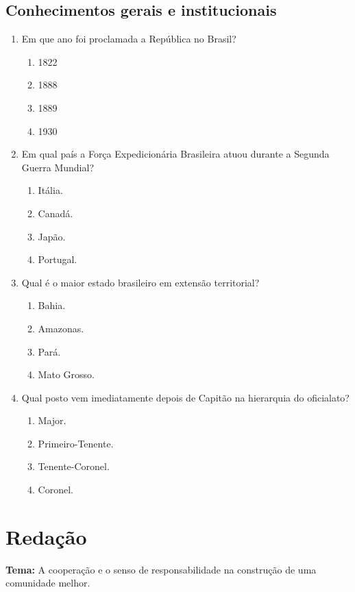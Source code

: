 \documentclass[12pt,a4paper]{article}
\begin{document}
\subsection*{Conhecimentos gerais e institucionais}
\begin{enumerate}[resume]
  \item Em que ano foi proclamada a República no Brasil?
  \begin{enumerate}[label=\alph*)]
    \item 1822
    \item 1888
    \item 1889
    \item 1930
  \end{enumerate}

  \item Em qual país a Força Expedicionária Brasileira atuou durante a Segunda Guerra Mundial?
  \begin{enumerate}[label=\alph*)]
    \item Itália.
    \item Canadá.
    \item Japão.
    \item Portugal.
  \end{enumerate}

  \item Qual é o maior estado brasileiro em extensão territorial?
  \begin{enumerate}[label=\alph*)]
    \item Bahia.
    \item Amazonas.
    \item Pará.
    \item Mato Grosso.
  \end{enumerate}

  \item Qual posto vem imediatamente depois de Capitão na hierarquia do oficialato?
  \begin{enumerate}[label=\alph*)]
    \item Major.
    \item Primeiro-Tenente.
    \item Tenente-Coronel.
    \item Coronel.
  \end{enumerate}
\end{enumerate}

\newpage
\section*{Redação}
\noindent\textbf{Tema:} A cooperação e o senso de responsabilidade na construção de uma comunidade melhor.
\end{document}
